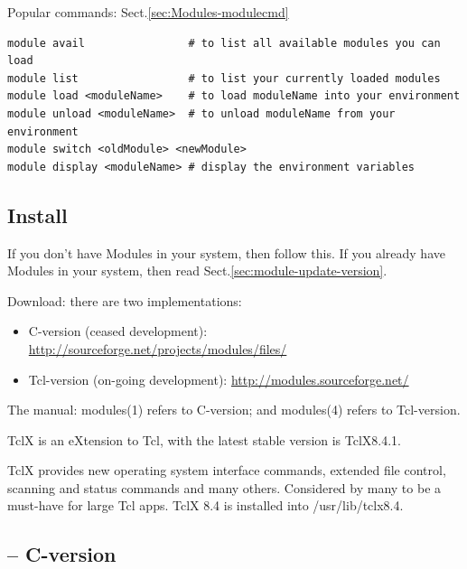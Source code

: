 Popular commands: Sect.\ref{sec:Modules-modulecmd}
\begin{verbatim}
module avail                # to list all available modules you can load
module list                 # to list your currently loaded modules
module load <moduleName>    # to load moduleName into your environment
module unload <moduleName>  # to unload moduleName from your environment
module switch <oldModule> <newModule>
module display <moduleName> # display the environment variables
\end{verbatim}


\subsection{Install}
\label{sec:install-Modules}

If you don't have Modules in your system, then follow this.
If you already have Modules in your system, then read
Sect.\ref{sec:module-update-version}.

Download: there are two implementations:   
  \begin{itemize}
    \item C-version (ceased development):
    \url{http://sourceforge.net/projects/modules/files/}
    \item Tcl-version (on-going development):
    \url{http://modules.sourceforge.net/}
  \end{itemize}
The manual: modules(1) refers to C-version; and modules(4) refers to
Tcl-version.

\begin{framed}
TclX is an eXtension to Tcl, with the latest stable version is TclX8.4.1.

TclX provides new operating system interface commands, extended file control,
scanning and status commands and many others. Considered by many to be a
must-have for large Tcl apps. TclX 8.4 is installed into /usr/lib/tclx8.4.
\end{framed}
  
\subsection{-- C-version}  
  
